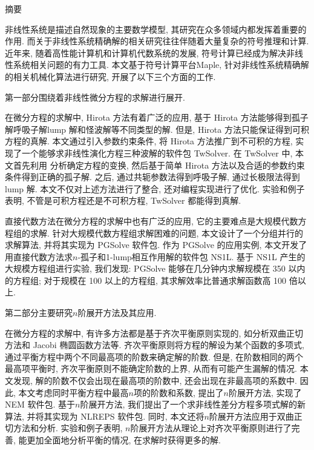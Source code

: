 {}
\centerline{\heiti 摘\quad 要}

\linespread{1.4} \bigskip

非线性系统是描述自然现象的主要数学模型, 其研究在众多领域内都发挥着重要的作用. 而关于非线性系统精确解的相关研究往往伴随着大量复杂的符号推理和计算. 近年来, 随着高性能计算机和计算机代数系统的发展, 符号计算已经成为解决非线性系统相关问题的有力工具. 本文基于符号计算平台Maple, 针对非线性系统精确解的相关机械化算法进行研究, 开展了以下三个方面的工作. 

第一部分围绕着非线性微分方程的求解进行展开. 

在微分方程的求解中, Hirota 方法有着广泛的应用, 基于 Hirota 方法能够得到孤子解\D 呼吸子解\D lump 解和怪波解等不同类型的解. 但是, Hirota 方法只能保证得到可积方程的真解. 本文通过引入参数约束条件, 将 Hirota 方法推广到不可积的方程, 实现了一个能够求非线性演化方程三种波解的软件包 TwSolver. 在 TwSolver 中, 本文首先利用 \Painleve{} 分析确定方程的变换, 然后基于简单 Hirota 方法以及合适的参数约束条件得到正确的孤子解. 之后, 通过共轭参数法得到呼吸子解, 通过长极限法得到 lump 解. 本文不仅对上述方法进行了整合, 还对编程实现进行了优化. 实验和例子表明, 不管是可积方程还是不可积方程, TwSolver 都能得到真解. 

直接代数方法在微分方程的求解中也有广泛的应用, 它的主要难点是大规模代数方程组的求解. 针对大规模代数方程组求解困难的问题, 本文设计了一个分组并行的求解算法, 并将其实现为 PGSolve 软件包. 作为 PGSolve 的应用实例, 本文开发了用直接代数方法求$n$-孤子和1-lump相互作用解的软件包 NS1L. 基于 NS1L 产生的大规模方程组进行实验, 我们发现: PGSolve 能够在几分钟内求解规模在 350 以内的方程组; 对于规模在 100 以上的方程组, 其求解效率比普通求解函数高 100 倍以上. 

第二部分主要研究$n$阶展开方法及其应用. 

在微分方程的求解中, 有许多方法都是基于齐次平衡原则实现的, 如\Painleve{}分析\D 双曲正切方法和 Jacobi 椭圆函数方法等. 齐次平衡原则将方程的解设为某个函数的多项式, 通过平衡方程中两个不同最高项的阶数来确定解的阶数. 但是, 在阶数相同的两个最高项平衡时, 齐次平衡原则不能确定阶数的上界, 从而有可能产生漏解的情况. 本文发现, 解的阶数不仅会出现在最高项的阶数中, 还会出现在非最高项的系数中. 因此, 本文考虑同时平衡方程中最高$n$项的阶数和系数, 提出了$n$阶展开方法, 实现了 NEM 软件包. 基于$n$阶展开方法, 我们提出了一个求非线性差分方程多项式解的新算法, 并将其实现为 NLREPS 软件包. 同时, 本文还将$n$阶展开方法应用于双曲正切方法和\Painleve{}分析. 实验和例子表明, $n$阶展开方法从理论上对齐次平衡原则进行了完善, 能更加全面地分析平衡的情况, 在求解时获得更多的解. 

